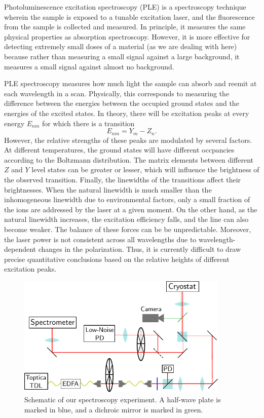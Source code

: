 \documentclass[12pt]{puthesis}
\begin{document}
Photoluminescence excitation spectroscopy (PLE) is a spectroscopy technique wherein the sample is exposed to a tunable excitation laser, and the fluorescence from the sample is collected and measured. In principle, it measures the same physical properties as absorption spectroscopy. However, it is more effective for detecting extremely small doses of a material (as we are dealing with here) because rather than measuring a small signal against a large background, it measures a small signal against almost no background.

PLE spectroscopy measures how much light the sample can absorb and reemit at each wavelength in a scan. Physically, this corresponds to measuring the difference between the energies between the occupied ground states and the energies of the excited states. In theory, there will be excitation peaks at every energy $E_{nm}$ for which there is a transition 
\begin{equation}\label{eq:6}
E_{nm} = Y_{m}-Z_{n}.
\end{equation}
However, the relative strengths of these peaks are modulated by several factors. At different temperatures, the ground states will have different occpancies according to the Boltzmann distribution. The matrix elements between different $Z$ and $Y$ level states can be greater or lesser, which will influence the brightness of the observed transition. Finally, the linewidths of the transitions affect their brightnesses. When the natural linewidth is much smaller than the inhomogeneous linewidth due to environmental factors, only a small fraction of the ions are addressed by the laser at a given moment. On the other hand, as the natural linewidth increases, the excitation efficiency falls, and the line can also become weaker. The balance of these forces can be be unpredictable. Moreover, the laser power is not consistent across all wavelengths due to wavelength-dependent changes in the polarization. Thus, it is currently difficult to draw precise quantitative conclusions based on the relative heights of different excitation peaks. 

\begin{figure}[t]
  \centering
  \includegraphics[width=0.9\textwidth]{PLESetupDiagram.pdf}
  \caption{Schematic of our spectroscopy experiment. A half-wave plate is marked in blue, and a dichroic mirror is marked in green. }
  \label{fig:ple}
\end{figure}
\end{document}
